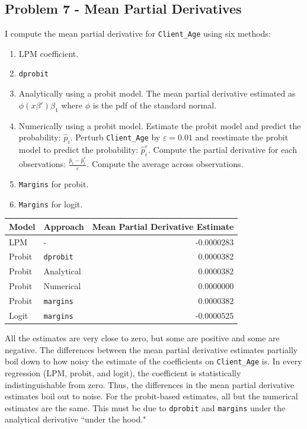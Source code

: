 \documentclass{article}
\begin{document}
\pagebreak

\subsection*{Problem 7 - Mean Partial Derivatives}

I compute the mean partial derivative for \texttt{Client\_Age} using six methods:

\begin{enumerate}
\item LPM coefficient.
\item \texttt{dprobit}
\item Analytically using a probit model. The mean partial derivative estimated as $\phi(x \beta') \beta_1$ where $\phi$ is the pdf of the standard normal.
\item Numerically using a probit model.  Estimate the probit model and predict the probability: $\hat{p}_i$.  Perturb \texttt{Client\_Age} by $\varepsilon = 0.01$ and reestimate the probit model to predict the probability: $\hat{p}^\varepsilon_i$. Compute the partial derivative for each observations: $\frac{\hat{p}_i - \hat{p}^\varepsilon_i}{\varepsilon}$. Compute the average across observations.
\item \texttt{Margins} for probit.
\item \texttt{Margins} for logit.
\end{enumerate}

\bigskip

\begin{center}
\begin{tabular}{ l l | r }
Model & Approach & Mean Partial Derivative Estimate\\ 
\hline
 LPM    & -                & -0.0000283 \\  
 Probit & \texttt{dprobit} &  0.0000382 \\
 Probit & Analytical       &  0.0000382 \\
 Probit & Numerical        &  0.0000000  \\
 Probit & \texttt{margins} &  0.0000382 \\
 Logit  & \texttt{margins} & -0.0000525
\end{tabular}
\end{center}

\bigskip

All the estimates are very close to zero, but some are positive and some are negative.  The differences between the mean partial derivative estimates partially boil down to how noisy the estimate of the coefficients on \texttt{Client\_Age} is.  In every regression (LPM, probit, and logit), the coefficient is statistically indistinguishable from zero.  Thus, the differences in the mean partial derivative estimates boil out to noise.  For the probit-based estimates, all but the numerical estimates are the same.  This must be due to \texttt{dprobit} and \texttt{margins} under the analytical derivative ``under the hood."
\end{document}
